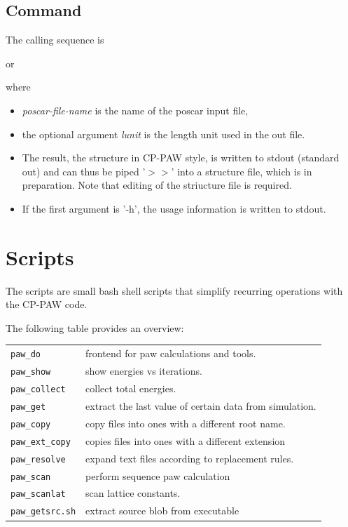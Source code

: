 \documentclass[final,12pt]{article}
\begin{document}
{{{{{{%
\subsection{Command}

The calling sequence is\bigskip

\bigskip

\noindent or\bigskip

\bigskip

\noindent
where 
\begin{itemize}
\item \textit{poscar-file-name} is the name of the poscar input file, 
\item the optional argument \textit{lunit} is the length unit used in
  the out file.
\item The result, the structure in CP-PAW style, is written to stdout
  (standard out) and can thus be piped '$>>$' into a structure file,
  which is in preparation. Note that editing of the striucture file is
  required.
\item If the first argument is '-h', the usage information is written
  to stdout.
\end{itemize}

\newpage
\section{Scripts}
The scripts are small bash shell scripts that simplify recurring operations
with the CP-PAW code. 

The following table provides an overview:\\
\begin{center}
\begin{tabular}{ll}
\verb|paw_do|      & frontend for paw calculations and tools. \\
\verb|paw_show|    & show energies vs iterations. \\
\verb|paw_collect| & collect total energies. \\
\verb|paw_get|     & extract the last value of certain data from simulation.\\
\verb|paw_copy|    & copy files into ones with a different root name.\\
\verb|paw_ext_copy|& copies files into ones with a different extension\\
\verb|paw_resolve| & expand text files according to replacement rules.\\
\verb|paw_scan|    & perform sequence paw calculation \\
\verb|paw_scanlat| & scan lattice constants. \\
\verb|paw_getsrc.sh| & extract source blob from executable\\
\end{tabular}
\end{center}

}}}}}}
\end{document}
